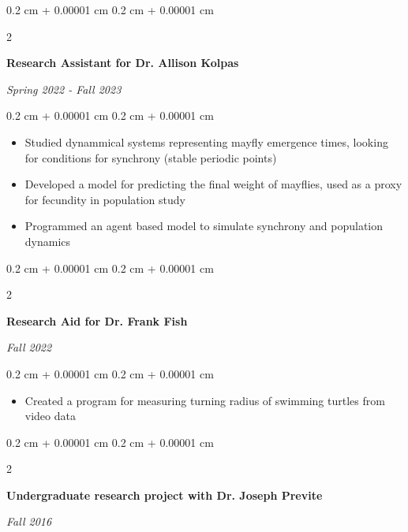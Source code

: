 \documentclass[10pt, letterpaper]{article}
\newenvironment{highlights}{
    \begin{itemize}[
        topsep=0.10 cm,
        parsep=0.10 cm,
        partopsep=0pt,
        itemsep=0pt,
        leftmargin=0.4 cm + 10pt
    ]
}{
    \end{itemize}
} %
\newenvironment{onecolentry}{
    \begin{adjustwidth}{
        0.2 cm + 0.00001 cm
    }{
        0.2 cm + 0.00001 cm
    }
}{
    \end{adjustwidth}
} %
\newenvironment{twocolentry}[2][]{
    \onecolentry
    \def\secondColumn{#2}
    \setcolumnwidth{\fill, 4.5 cm}
    \begin{paracol}{2}
}{
    \switchcolumn \raggedleft \secondColumn
    \end{paracol}
    \endonecolentry
} %
\begin{document}
        
        \begin{twocolentry}{
            
            
        \textit{Spring 2022 - Fall 2023}}
            \textbf{Research Assistant for Dr. Allison Kolpas}
        \end{twocolentry}

        \vspace{0.10 cm}
        \begin{onecolentry}
            \begin{highlights}
                \item Studied dynammical systems representing mayfly emergence times, looking for conditions for synchrony (stable periodic points)
                \item Developed a model for predicting the final weight of mayflies, used as a proxy for fecundity in population study
                \item Programmed an agent based model to simulate synchrony and population dynamics
            \end{highlights}
        \end{onecolentry}


        \vspace{0.2 cm}

        \begin{twocolentry}{
            
            
        \textit{Fall 2022}}
            \textbf{Research Aid for Dr. Frank Fish}
        \end{twocolentry}

        \vspace{0.10 cm}
        \begin{onecolentry}
            \begin{highlights}
                \item Created a program for measuring turning radius of swimming turtles from video data
            \end{highlights}
        \end{onecolentry}


        \vspace{0.2 cm}

        \begin{twocolentry}{
            
            
        \textit{Fall 2016}}
            \textbf{Undergraduate research project with Dr. Joseph Previte}
        \end{twocolentry}
\end{document}
